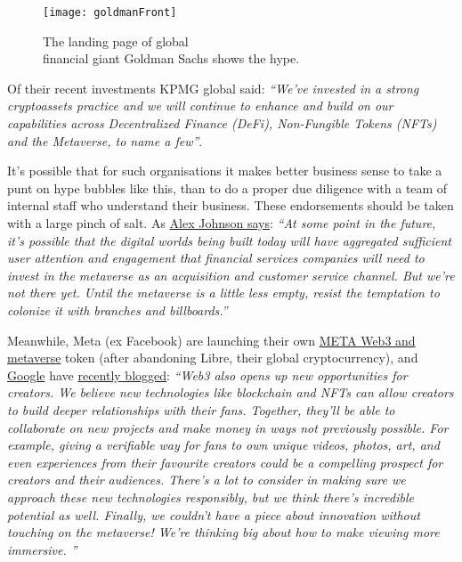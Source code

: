 \documentclass[
	12pt, %
	fleqn, %
	a4paper, %
	oneside, %
]{LegrandOrangeBook}
\begin{document}
\begin{figure}[ht]\centering %
	\texttt{[image: goldmanFront]}
	\caption{The landing page of global\\financial giant Goldman Sachs shows the hype.}
	\label{fig:goldmanFront}
\end{figure}
Of their recent investments KPMG global said: \textit{``We've invested in a strong cryptoassets practice and we will continue to enhance and build on our capabilities across Decentralized Finance (DeFi), Non-Fungible Tokens (NFTs) and the Metaverse, to name a few''}.\par
It's possible that for such organisations it makes better business sense to take a punt on hype bubbles like this, than to do a proper due diligence with a team of internal staff who understand their business. These endorsements should be taken with a large pinch of salt. As \href{https://newsletter.fintechtakes.com/p/metaverse-branches?s=r}{Alex Johnson says}: \textit{``At some point in the future, it’s possible that the digital worlds being built today will have aggregated sufficient user attention and engagement that financial services companies will need to invest in the metaverse as an acquisition and customer service channel. But we’re not there yet. Until the metaverse is a little less empty, resist the temptation to colonize it with branches and billboards.''}\par
Meanwhile, Meta (ex Facebook) are launching their own \href{https://archive.ph/coyp2}{META Web3 and metaverse} token (after abandoning Libre, their global cryptocurrency), and \href{https://www.cnbc.com/2022/05/06/googles-cloud-group-forms-web3-product-and-engineering-team.html}{Google} have \href{https://blog.youtube/inside-youtube/innovations-for-2022-at-youtube/}{recently blogged}: \textit{``Web3 also opens up new opportunities for creators. We believe new technologies like blockchain and NFTs can allow creators to build deeper relationships with their fans. Together, they'll be able to collaborate on new projects and make money in ways not previously possible. For example, giving a verifiable way for fans to own unique videos, photos, art, and even experiences from their favourite creators could be a compelling prospect for creators and their audiences. There's a lot to consider in making sure we approach these new technologies responsibly, but we think there's incredible potential as well. Finally, we couldn't have a piece about innovation without touching on the metaverse! We're thinking big about how to make viewing more immersive. ''}\par
\end{document}

